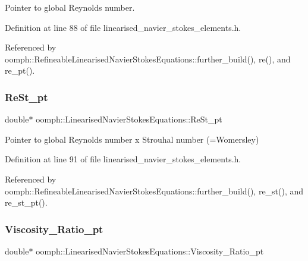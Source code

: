 Pointer to global Reynolds number. 



Definition at line 88 of file linearised\+\_\+navier\+\_\+stokes\+\_\+elements.\+h.



Referenced by oomph\+::\+Refineable\+Linearised\+Navier\+Stokes\+Equations\+::further\+\_\+build(), re(), and re\+\_\+pt().

\mbox{\label{classoomph_1_1LinearisedNavierStokesEquations_ab40d84a723664869c2e6ce163c712ec6}} 
\subsubsection{\texorpdfstring{Re\+St\+\_\+pt}{ReSt\_pt}}
{\footnotesize\ttfamily double$\ast$ oomph\+::\+Linearised\+Navier\+Stokes\+Equations\+::\+Re\+St\+\_\+pt\hspace{0.3cm}{\ttfamily [protected]}}



Pointer to global Reynolds number x Strouhal number (=Womersley) 



Definition at line 91 of file linearised\+\_\+navier\+\_\+stokes\+\_\+elements.\+h.



Referenced by oomph\+::\+Refineable\+Linearised\+Navier\+Stokes\+Equations\+::further\+\_\+build(), re\+\_\+st(), and re\+\_\+st\+\_\+pt().

\mbox{\label{classoomph_1_1LinearisedNavierStokesEquations_a901c605744c9bd88ef496383feceee55}} 
\subsubsection{\texorpdfstring{Viscosity\+\_\+\+Ratio\+\_\+pt}{Viscosity\_Ratio\_pt}}
{\footnotesize\ttfamily double$\ast$ oomph\+::\+Linearised\+Navier\+Stokes\+Equations\+::\+Viscosity\+\_\+\+Ratio\+\_\+pt\hspace{0.3cm}{\ttfamily [protected]}}



